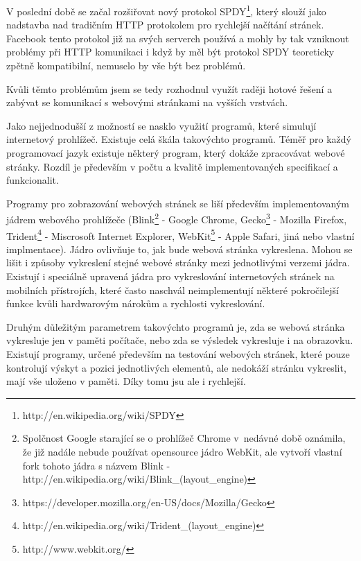 \documentclass[thesis=M,czech]{FITthesis}[2013/05/10]
\begin{document}
V poslední době se začal rozšiřovat nový protokol 
SPDY\footnote{http://en.wikipedia.org/wiki/SPDY}, který slouží jako 
nadstavba nad tradičním HTTP protokolem pro rychlejší načítání 
stránek. Facebook tento protokol již na svých serverch používá 
a mohly by tak vzniknout problémy při HTTP komunikaci i když by měl 
být protokol SPDY teoreticky zpětně kompatibilní, nemuselo by vše být 
bez problémů.

Kvůli těmto problémům jsem se tedy rozhodnul využít raději hotové 
řešení a zabývat se komunikací s webovými stránkami na vyšších 
vrstvách. 

Jako nejjednodušší z možností se nasklo využití programů, které 
simulují internetový prohlížeč. Existuje celá škála takovýchto 
programů. Téměř pro každý programovací jazyk existuje některý program, 
který dokáže zpracovávat webové stránky. Rozdíl je především v počtu a 
kvalitě implementovaných specifikací a funkcionalit.

Programy pro zobrazování webových stránek se liší především 
implementovaným jádrem webového prohlížeče 
(Blink\footnote{Spolčnost Google starající se o prohlížeč Chrome 
v~nedávné době oznámila, že již nadále nebude používat opensource 
jádro WebKit, ale vytvoří vlastní fork tohoto jádra s názvem 
Blink -  
http://en.wikipedia.org/wiki/Blink\_(layout\_engine)}
 - Google Chrome, 
Gecko\footnote{https://developer.mozilla.org/en-US/docs/Mozilla/Gecko} 
- Mozilla Firefox, 
Trident\footnote{http://en.wikipedia.org/wiki/Trident\_(layout\_engine)} 
- Miscrosoft Internet Explorer, 
WebKit\footnote{http://www.webkit.org/}
 - Apple Safari, jiná nebo vlastní implmentace). Jádro ovlivňuje to, 
jak bude webová stránka vykreslena. Mohou se lišit i způsoby 
vykreslení stejné webové stránky mezi jednotlivými verzemi jádra. 
Existují i speciálně upravená jádra pro vykreslování internetových 
stránek na mobilních přístrojích, které často naschvál neimplementují
některé pokročilejší funkce kvůli hardwarovým nárokům a rychlosti 
vykreslování.

Druhým důležitým parametrem takovýchto programů je, zda se webová 
stránka vykresluje jen v paměti počítače, nebo zda se výsledek 
vykresluje i na obrazovku. Existují programy, určené především na 
testování webových stránek, které pouze kontrolují výskyt a pozici 
jednotlivých elementů, ale nedokáží stránku vykreslit, mají vše 
uloženo v paměti. Díky tomu jsu ale i rychlejší.
 
\end{document}
